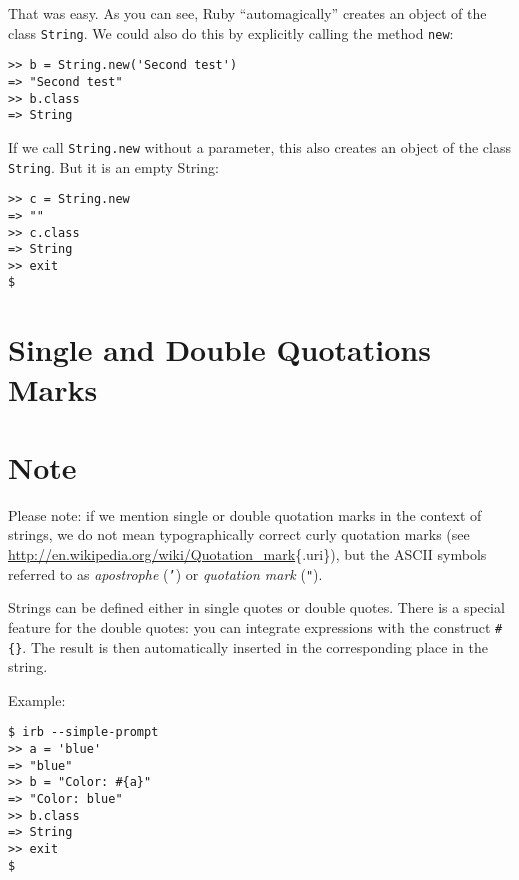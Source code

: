 \documentclass[a4paper]{book}
\begin{document}
That was easy. As you can see, Ruby “automagically” creates an object of the class \texttt{String}. We could also do this by explicitly calling the method \texttt{new}:

\begin{shaded}\begin{verbatim}
>> b = String.new('Second test')
=> "Second test"
>> b.class
=> String
\end{verbatim}\end{shaded}

If we call \texttt{String.new} without a parameter, this also creates an object of the class \texttt{String}. But it is an empty String:

\begin{shaded}\begin{verbatim}
>> c = String.new
=> ""
>> c.class
=> String
>> exit
$
\end{verbatim}\end{shaded}

\section{Single and Double Quotations Marks}\label{single-and-double-quotations-marks}

\section{Note}\label{note-6}

Please note: if we mention single or double quotation marks in the context of strings, we do not mean typographically correct curly quotation marks (see \url{http://en.wikipedia.org/wiki/Quotation_mark}\{.uri\}), but the ASCII symbols referred to as \emph{apostrophe} (\texttt{'}) or \emph{quotation mark} (\texttt{"}).

Strings can be defined either in single quotes or double quotes. There is a special feature for the double quotes: you can integrate expressions with the construct \texttt{\#\{\}}. The result is then automatically inserted in the corresponding place in the string.

Example:

\begin{shaded}\begin{verbatim}
$ irb --simple-prompt
>> a = 'blue'
=> "blue"
>> b = "Color: #{a}"
=> "Color: blue"
>> b.class
=> String
>> exit
$
\end{verbatim}\end{shaded}
\end{document}
